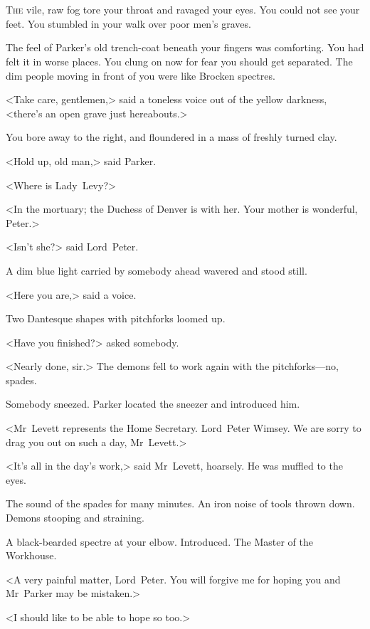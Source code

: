\chapter[Chapter \thechapter]{}
\lettrine{T}{he} vile, raw fog tore your throat and ravaged your eyes. You could not see your feet. You stumbled in your walk over poor men's graves.

\zz
The feel of Parker's old trench-coat beneath your fingers was comforting. You had felt it in worse places. You clung on now for fear you should get separated. The dim people moving in front of you were like Brocken spectres.

<Take care, gentlemen,> said a toneless voice out of the yellow darkness, <there's an open grave just hereabouts.>

You bore away to the right, and floundered in a mass of freshly turned clay.

<Hold up, old man,> said Parker.

<Where is Lady~Levy?>

<In the mortuary; the Duchess of Denver is with her. Your mother is wonderful, Peter.>

<Isn't she?> said Lord~Peter.

A dim blue light carried by somebody ahead wavered and stood still.

<Here you are,> said a voice.

Two Dantesque shapes with pitchforks loomed up.

<Have you finished?> asked somebody.

<Nearly done, sir.> The demons fell to work again with the pitchforks—no, spades.

Somebody sneezed. Parker located the sneezer and introduced him.

<Mr~Levett represents the Home Secretary. Lord~Peter Wimsey. We are sorry to drag you out on such a day, Mr~Levett.>

<It's all in the day's work,> said Mr~Levett, hoarsely. He was muffled to the eyes.

The sound of the spades for many minutes. An iron noise of tools thrown down. Demons stooping and straining.

A black-bearded spectre at your elbow. Introduced. The Master of the Workhouse.

<A very painful matter, Lord~Peter. You will forgive me for hoping you and Mr~Parker may be mistaken.>

<I should like to be able to hope so too.>

